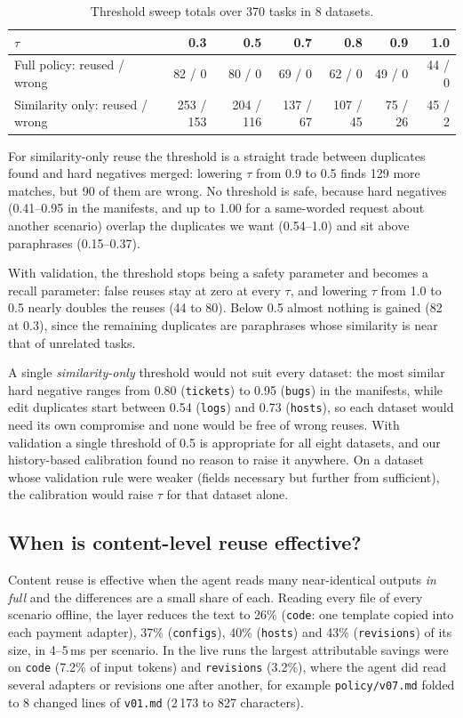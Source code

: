 \documentclass[11pt]{article}
\begin{document}
\begin{table}[H]
\centering\small
\begin{tabular}{lrrrrrr}
\toprule
$\tau$ & 0.3 & 0.5 & 0.7 & 0.8 & 0.9 & 1.0 \\
\midrule
Full policy: reused / wrong & 82 / 0 & 80 / 0 & 69 / 0 & 62 / 0 & 49 / 0 & 44 / 0 \\
Similarity only: reused / wrong & 253 / 153 & 204 / 116 & 137 / 67 & 107 / 45 & 75 / 26 & 45 / 2 \\
\bottomrule
\end{tabular}
\caption{Threshold sweep totals over 370 tasks in 8 datasets.}
\label{tab:sweep}
\end{table}

For similarity-only reuse the threshold is a straight trade between duplicates found and hard
negatives merged: lowering $\tau$ from 0.9 to 0.5 finds 129 more matches, but 90 of them are
wrong. No threshold is safe, because hard negatives (0.41--0.95 in the manifests, and up to 1.00
for a same-worded request about another scenario) overlap the duplicates we want (0.54--1.0)
and sit above paraphrases (0.15--0.37).

With validation, the threshold stops being a safety parameter and becomes a recall
parameter: false reuses stay at zero at every $\tau$, and lowering $\tau$ from 1.0 to 0.5
nearly doubles the reuses (44 to 80). Below 0.5 almost nothing is gained (82 at 0.3), since
the remaining duplicates are paraphrases whose similarity is near that of unrelated tasks.

A single \emph{similarity-only} threshold would not suit every dataset: the most similar
hard negative ranges from 0.80 (\texttt{tickets}) to 0.95 (\texttt{bugs}) in the manifests,
while edit duplicates start between 0.54 (\texttt{logs}) and 0.73 (\texttt{hosts}), so each
dataset would need its own compromise and none would be free of wrong reuses. With
validation a single threshold of 0.5 is appropriate for all eight datasets, and our
history-based calibration found no reason to raise it anywhere. On a dataset whose
validation rule were weaker (fields necessary but further from sufficient), the calibration
would raise $\tau$ for that dataset alone.

\subsection{When is content-level reuse effective?}

Content reuse is effective when the agent reads many near-identical outputs \emph{in full}
and the differences are a small share of each. Reading every file of every scenario offline,
the layer reduces the text to 26\% (\texttt{code}: one template copied into each payment
adapter), 37\% (\texttt{configs}), 40\% (\texttt{hosts}) and 43\% (\texttt{revisions}) of its
size, in 4--5\,ms per scenario. In the live runs the largest attributable savings were on
\texttt{code} (7.2\% of input tokens) and \texttt{revisions} (3.2\%), where the agent did
read several adapters or revisions one after another, for example \texttt{policy/v07.md}
folded to 8 changed lines of \texttt{v01.md} (2\,173 to 827 characters).
\end{document}
